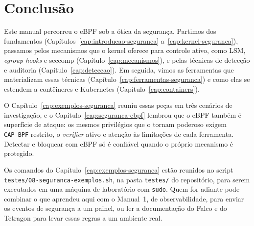 \chapter{Conclusão}
\label{cap:conclusao-seguranca}

Este manual percorreu o eBPF sob a ótica da segurança. Partimos dos fundamentos
(Capítulos~\ref{cap:introducao-seguranca} a~\ref{cap:kernel-seguranca}),
passamos pelos mecanismos que o kernel oferece para controle ativo, como LSM,
\textit{cgroup hooks} e seccomp (Capítulo~\ref{cap:mecanismos}), e pelas técnicas
de detecção e auditoria (Capítulo~\ref{cap:deteccao}). Em seguida, vimos as
ferramentas que materializam essas técnicas (Capítulo~\ref{cap:ferramentas-seguranca})
e como elas se estendem a contêineres e Kubernetes (Capítulo~\ref{cap:containers}).

O Capítulo~\ref{cap:exemplos-seguranca} reuniu essas peças em três cenários de
investigação, e o Capítulo~\ref{cap:seguranca-ebpf} lembrou que o eBPF também é
superfície de ataque: os mesmos privilégios que o tornam poderoso exigem
\texttt{CAP\_BPF} restrito, o \textit{verifier} ativo e atenção às limitações de
cada ferramenta. Detectar e bloquear com eBPF só é confiável quando o próprio
mecanismo é protegido.

Os comandos do Capítulo~\ref{cap:exemplos-seguranca} estão reunidos no script
\texttt{testes/08-seguranca-exemplos.sh}, na pasta \texttt{testes/} do repositório,
para serem executados em uma máquina de laboratório com \texttt{sudo}. Quem for
adiante pode combinar o que aprendeu aqui com o Manual~1, de observabilidade,
para enviar os eventos de segurança a um painel, ou ler a documentação do Falco e
do Tetragon para levar essas regras a um ambiente real.
